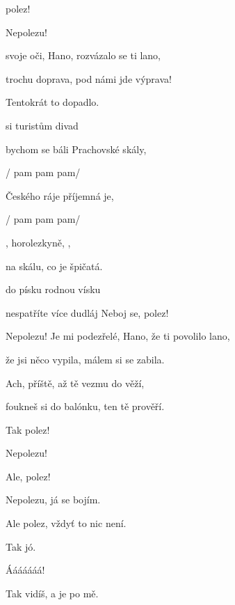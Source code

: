 

 polez!

Nepolezu!

\zs
{} svoje oči, Hano, rozvázalo se ti lano,

 trochu doprava, pod námi jde výprava!


Tentokrát to  dopadlo.

 si turistům  divad   \ks

\zr
{} bychom se báli  Prachovské skály,

   / pam pam pam/

 Českého ráje  příjemná je,

   / pam pam pam/

, horolezkyně, ,

 na skálu, co je  špičatá.

 do písku  rodnou vísku

nespatříte více dudláj 
\kr
Neboj se, polez!

Nepolezu!
\zs
Je mi podezřelé, Hano, že ti povolilo lano,

že jsi něco vypila, málem si se zabila.

Ach, příště, až tě vezmu do věží,

foukneš si do balónku, ten tě prověří.
\ks

\zr	\kr

Tak polez!

Nepolezu!

Ale, polez!

Nepolezu, já se bojím.

Ale polez, vždyť to nic není.

Tak jó.

Ááááááá!

Tak vidíš, a je po mě.

\kp


